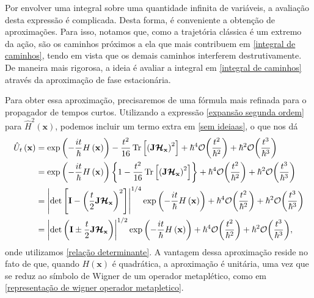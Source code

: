 \documentclass[
	12pt,
	oneside,			%
	a4paper,			%
	english,			%
	brazil				%
	]{abntex2}
\theoremstyle{definition}
\begin{document}
Por envolver uma integral sobre uma quantidade infinita de variáveis, a avaliação desta expressão é complicada. Desta forma, é conveniente a obtenção de aproximações. Para isso, notamos que, como a trajetória clássica é um extremo da ação, são os caminhos próximos a ela que mais contribuem em \eqref{integral de caminhos}, tendo em vista que os demais caminhos interferem destrutivamente. De maneira mais rigorosa, a ideia é avaliar a integral em \eqref{integral de caminhos} através da aproximação de fase estacionária.

Para obter essa aproximação, precisaremos de uma fórmula mais refinada para o propagador de tempos curtos. Utilizando a expressão \eqref{expansão segunda ordem} para $\hat{H}^2(\mathbf{x})$, podemos incluir um termo extra em \eqref{sem ideiaas}, o que nos dá
\begin{equation}
    \begin{aligned}
        \hat{U}_t\left( \mathbf{x} \right) &= \exp\left( -\frac{it}{\hbar} H\left(\mathbf{x}\right) \right) - \frac{t^2}{16} \Tr \left[\left( \mathbf{J} \boldsymbol{\mathcal{H}_{\mathbf{x}}} \right)^2\right] + \hbar^4\order{\frac{t^2}{\hbar^2}} + \hbar^2 \order{\frac{t^3}{\hbar^3}} \\
        &= \exp\left( -\frac{it}{\hbar} H\left(\mathbf{x}\right) \right)\left\{1 - \frac{t^2}{16} \Tr \left[\left( \mathbf{J} \boldsymbol{\mathcal{H}_{\mathbf{x}}} \right)^2\right] \right\}+ \hbar^4\order{\frac{t^2}{\hbar^2}} + \hbar^2 \order{\frac{t^3}{\hbar^3}} \\
        &= \left| \det \left[\mathbf{I}-\left( \frac{t}{2} \mathbf{J} \boldsymbol{\mathcal{H}}_\mathbf{x} \right)^2 \right]\right|^{1/4} \exp\left( -\frac{it}{\hbar} H\left(\mathbf{x}\right) \right) + \hbar^4\order{\frac{t^2}{\hbar^2}} + \hbar^2 \order{\frac{t^3}{\hbar^3}} \\
         &= \left| \det \left(\mathbf{I} \pm \frac{t}{2} \mathbf{J} \boldsymbol{\mathcal{H}}_\mathbf{x}  \right)\right|^{1/2} \exp\left( -\frac{it}{\hbar} H\left(\mathbf{x}\right) \right) + \hbar^4\order{\frac{t^2}{\hbar^2}} + \hbar^2 \order{\frac{t^3}{\hbar^3}},
    \end{aligned}
\end{equation}
onde utilizamos \eqref{relação determinante}. A vantagem dessa aproximação reside no fato de que, quando $H\left(\mathbf{x}\right)$ é quadrática, a aproximação é unitária, uma vez que se reduz ao símbolo de Wigner de um operador metaplético, como em \eqref{representação de wigner operador metapletico}.
\end{document}
